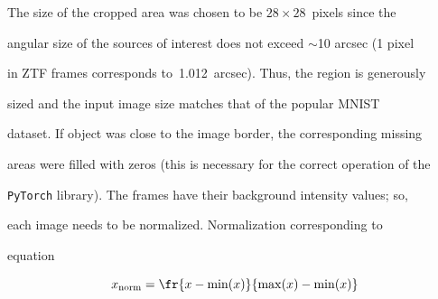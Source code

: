 The size of the cropped area was chosen to be $28\times28$~pixels since the 

angular size of the sources of interest does not exceed $\sim$10 arcsec (1 pixel 

in ZTF frames corresponds to~1.012~arcsec). Thus, the region is generously 

sized and the input image size matches that of the popular MNIST~\cite{6296535} 

dataset. If object was close to the image border, the corresponding missing 

areas were filled with zeros (this is necessary for the correct operation of the 

{\tt PyTorch} library). The frames have their background intensity values; so, 

each image needs to be normalized. Normalization corresponding to 

equation

\begin{equation*}

 \label{norm}

    x_{\mathrm{norm}} = \fr{x - \min(x)}{\max(x) - \min(x)}

\end{equation*}



\pagebreak



\



\vspace*{-12pt}




